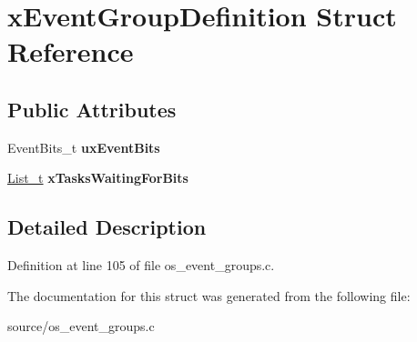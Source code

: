 \hypertarget{structxEventGroupDefinition}{}\section{x\+Event\+Group\+Definition Struct Reference}
\label{structxEventGroupDefinition}
\subsection*{Public Attributes}
\begin{DoxyCompactItemize}
\item 
\mbox{\label{structxEventGroupDefinition_ad7c19a46f5f4557e466209962b5e4610}} 
Event\+Bits\+\_\+t {\bfseries ux\+Event\+Bits}
\item 
\mbox{\label{structxEventGroupDefinition_a6570ba98d93dcba9cb03de0c62df9044}} 
\mbox{\hyperlink{structxLIST}{List\+\_\+t}} {\bfseries x\+Tasks\+Waiting\+For\+Bits}
\end{DoxyCompactItemize}


\subsection{Detailed Description}


Definition at line 105 of file os\+\_\+event\+\_\+groups.\+c.



The documentation for this struct was generated from the following file\+:\begin{DoxyCompactItemize}
\item 
source/os\+\_\+event\+\_\+groups.\+c\end{DoxyCompactItemize}
